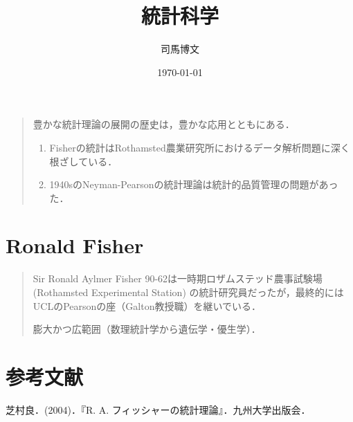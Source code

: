 \documentclass[uplatex,dvipdfmx]{jsreport}
\title{統計科学}
\author{司馬博文}
\date{\today}
\begin{document}
\tableofcontents

\begin{quotation}
    豊かな統計理論の展開の歴史は，豊かな応用とともにある．
    \begin{enumerate}
        \item Fisherの統計はRothamsted農業研究所におけるデータ解析問題に深く根ざしている．
        \item 1940sのNeyman-Pearsonの統計理論は統計的品質管理の問題があった．
    \end{enumerate}
\end{quotation}

\chapter{Ronald Fisher}

\begin{quotation}
    Sir Ronald Aylmer Fisher 90-62は一時期ロザムステッド農事試験場 (Rothamsted Experimental Station) の統計研究員だったが，最終的にはUCLのPearsonの座（Galton教授職）を継いでいる．

    膨大かつ広範囲（数理統計学から遺伝学・優生学）．
    
\end{quotation}

\chapter{参考文献}

\begin{thebibliography}{99}
    芝村良．(2004)．『R. A. フィッシャーの統計理論』．九州大学出版会．
\end{thebibliography}
\end{document}
